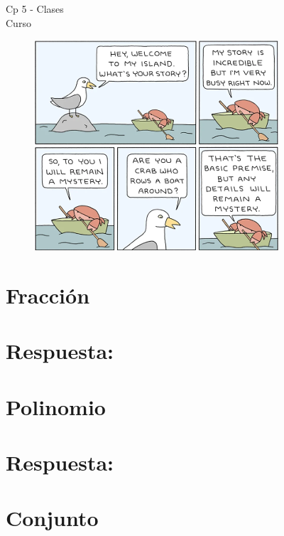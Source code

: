 \begin{center}
    \begin{large}
    Cp 5 - Clases\\
    Curso \academicyear\\
    \end{large}
    \begin{figure}[h]
    	\centering
    	\includegraphics[width=0.5\linewidth]{cp5/classes.png}
    \end{figure}
\end{center}

% 

\section{Fracción}


\ifshowanswers
\section*{Respuesta:}

\fi

\section{Polinomio}


\ifshowanswers
\section*{Respuesta:}

\fi

\section{Conjunto}


